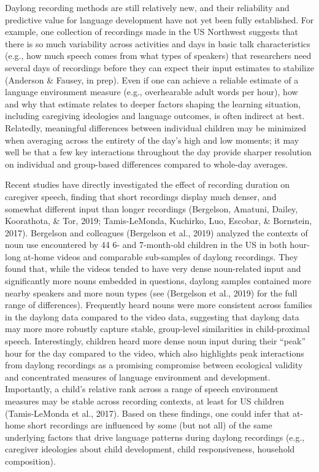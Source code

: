 \documentclass[,man,floatsintext]{apa6}
\begin{document}
Daylong recording methods are still relatively new, and their
reliability and predictive value for language development have not yet
been fully established. For example, one collection of recordings made
in the US Northwest suggests that there is so much variability across
activities and days in basic talk characteristics (e.g., how much speech
comes from what types of speakers) that researchers need several days of
recordings before they can expect their input estimates to stabilize
(Anderson \& Fausey, in prep). Even if one can achieve a reliable
estimate of a language environment measure (e.g., overhearable adult
words per hour), how and why that estimate relates to deeper factors
shaping the learning situation, including caregiving ideologies and
language outcomes, is often indirect at best. Relatedly, meaningful
differences between individual children may be minimized when averaging
across the entirety of the day's high and low moments; it may well be
that a few key interactions throughout the day provide sharper
resolution on individual and group-based differences compared to
whole-day averages.

Recent studies have directly investigated the effect of recording
duration on caregiver speech, finding that short recordings display much
denser, and somewhat different input than longer recordings (Bergelson,
Amatuni, Dailey, Koorathota, \& Tor, 2019; Tamis-LeMonda, Kuchirko, Luo,
Escobar, \& Bornstein, 2017). Bergelson and colleagues (Bergelson et
al., 2019) analyzed the contexts of noun use encountered by 44 6- and
7-month-old children in the US in both hour-long at-home videos and
comparable sub-samples of daylong recordings. They found that, while the
videos tended to have very dense noun-related input and significantly
more nouns embedded in questions, daylong samples contained more nearby
speakers and more noun types (see (Bergelson et al., 2019) for the full
range of differences). Frequently heard nouns were more consistent
across families in the daylong data compared to the video data,
suggesting that daylong data may more more robustly capture stable,
group-level similarities in child-proximal speech. Interestingly,
children heard more dense noun input during their \enquote{peak} hour
for the day compared to the video, which also highlights peak
interactions from daylong recordings as a promising compromise between
ecological validity and concentrated measures of language environment
and development. Importantly, a child's relative rank across a range of
speech environment measures may be stable across recording contexts, at
least for US children (Tamis-LeMonda et al., 2017). Based on these
findings, one could infer that at-home short recordings are influenced
by some (but not all) of the same underlying factors that drive language
patterns during daylong recordings (e.g., caregiver ideologies about
child development, child responsiveness, household composition).
\end{document}
